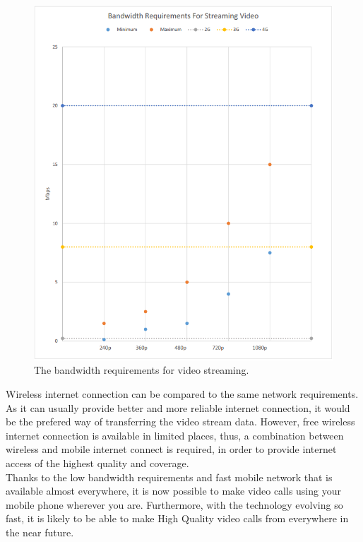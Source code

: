 \documentclass[]{article}
\begin{document}
\begin{figure}[H]
		\centering
		\includegraphics[width=1\textwidth]{"SDS Video Bandwidth"}
		\caption{The bandwidth requirements for video streaming.}
	\end{figure}
	
	Wireless internet connection can be compared to the same network requirements. As it can usually provide better and more reliable internet connection, it would be the prefered way of transferring the video stream data. However, free wireless internet connection is available in limited places, thus, a combination between wireless and mobile internet connect is required, in order to provide internet access of the highest quality and coverage.\\

Thanks to the low bandwidth requirements and fast mobile network that is available almost everywhere, it is now possible to make video calls using your mobile phone wherever you are. Furthermore, with the technology evolving so fast, it is likely to be able to make High Quality video calls from everywhere in the near future.\\
\end{document}
